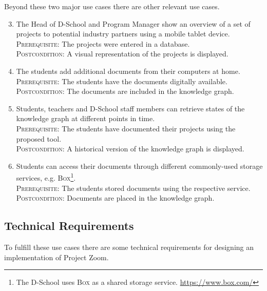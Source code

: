 Beyond these two major use cases there are other relevant use cases.

\begin{enumerate}
\setcounter{enumi}{2}

\item The Head of D-School and Program Manager show an overview of a set of projects to potential industry partners using a mobile tablet device.\\
\textsc{Prerequisite}: The projects were entered in a database.\\
\textsc{Postcondition}: A visual representation of the projects is displayed. \label{uc:3}

\item The students add additional documents from their computers at home.\\
\textsc{Prerequisite}: The students have the documents digitally available.\\
\textsc{Postcondition}: The documents are included in the knowledge graph. \label{uc:4}

\item Students, teachers and D-School staff members can retrieve states of the knowledge graph at different points in time.\\
\textsc{Prerequisite}: The students have documented their projects using the proposed tool.\\
\textsc{Postcondition}: A historical version of the knowledge graph is displayed.  \label{uc:5}

\item Students can access their documents through different commonly-used storage services, e.g. \textsc{Box}\footnote{The D-School uses \textsc{Box} as a shared storage service. \url{https://www.box.com/}}.\\
\textsc{Prerequisite}: The students stored documents using the respective service.\\
\textsc{Postcondition}: Documents are placed in the knowledge graph.  \label{uc:6}
\end{enumerate}

\subsection{Technical Requirements}

To fulfill these use cases there are some technical requirements for designing an implementation of Project Zoom.

